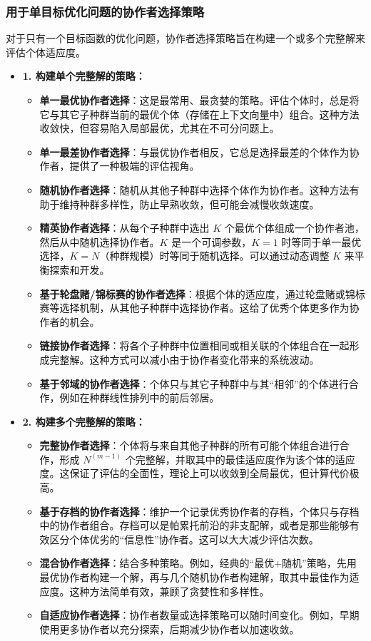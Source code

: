 \subsubsection{用于单目标优化问题的协作者选择策略}
对于只有一个目标函数的优化问题，协作者选择策略旨在构建一个或多个完整解来评估个体适应度。
    \begin{itemize}
        \item \textbf{1. 构建单个完整解的策略：}
        \begin{itemize}
            \item \textbf{单一最优协作者选择}：这是最常用、最贪婪的策略。评估个体时，总是将它与其它子种群当前的最优个体（存储在上下文向量中）组合。这种方法收敛快，但容易陷入局部最优，尤其在不可分问题上。
            \item \textbf{单一最差协作者选择}：与最优协作者相反，它总是选择最差的个体作为协作者，提供了一种极端的评估视角。
            \item \textbf{随机协作者选择}：随机从其他子种群中选择个体作为协作者。这种方法有助于维持种群多样性，防止早熟收敛，但可能会减慢收敛速度。
            \item \textbf{精英协作者选择}：从每个子种群中选出 $K$ 个最优个体组成一个协作者池，然后从中随机选择协作者。$K$ 是一个可调参数，$K=1$ 时等同于单一最优选择，$K=N$（种群规模）时等同于随机选择。可以通过动态调整 $K$ 来平衡探索和开发。
            \item \textbf{基于轮盘赌/锦标赛的协作者选择}：根据个体的适应度，通过轮盘赌或锦标赛等选择机制，从其他子种群中选择协作者。这给了优秀个体更多作为协作者的机会。
            \item \textbf{链接协作者选择}：将各个子种群中位置相同或相关联的个体组合在一起形成完整解。这种方式可以减小由于协作者变化带来的系统波动。
            \item \textbf{基于邻域的协作者选择}：个体只与其它子种群中与其“相邻”的个体进行合作，例如在种群线性排列中的前后邻居。
        \end{itemize}
        \item \textbf{2. 构建多个完整解的策略：}
        \begin{itemize}
            \item \textbf{完整协作者选择}：个体将与来自其他子种群的所有可能个体组合进行合作，形成 $N^{(m-1)}$ 个完整解，并取其中的最佳适应度作为该个体的适应度。这保证了评估的全面性，理论上可以收敛到全局最优，但计算代价极高。
            \item \textbf{基于存档的协作者选择}：维护一个记录优秀协作者的存档，个体只与存档中的协作者组合。存档可以是帕累托前沿的非支配解，或者是那些能够有效区分个体优劣的“信息性”协作者。这可以大大减少评估次数。
            \item \textbf{混合协作者选择}：结合多种策略。例如，经典的“最优+随机”策略，先用最优协作者构建一个解，再与几个随机协作者构建解，取其中最佳作为适应度。这种方法简单有效，兼顾了贪婪性和多样性。
            \item \textbf{自适应协作者选择}：协作者数量或选择策略可以随时间变化。例如，早期使用更多协作者以充分探索，后期减少协作者以加速收敛。
        \end{itemize}
    \end{itemize}

